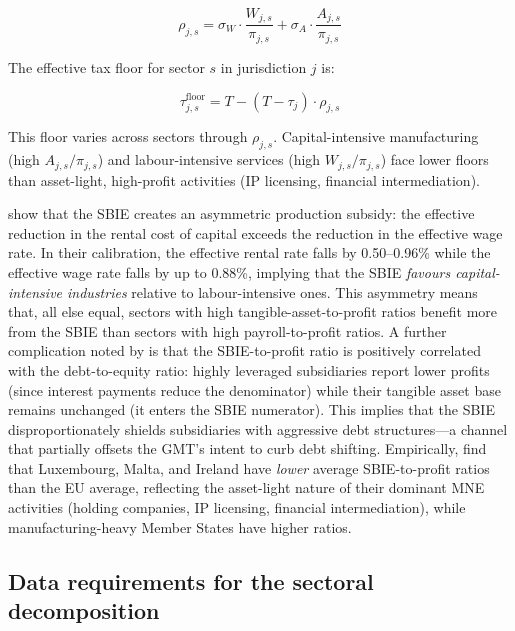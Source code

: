 \documentclass[11pt,a4paper]{article}
\begin{document}
\begin{equation}\label{eq:rho_sector}
\rho_{j,s} = \sigma_W \cdot \frac{W_{j,s}}{\pi_{j,s}} + \sigma_A \cdot \frac{A_{j,s}}{\pi_{j,s}}
\end{equation}

The effective tax floor for sector $s$ in jurisdiction $j$ is:

\begin{equation}\label{eq:floor_sector}
\tau_{j,s}^{\text{floor}} = T - (T - \tau_j) \cdot \rho_{j,s}
\end{equation}

This floor varies across sectors through $\rho_{j,s}$. Capital-intensive manufacturing (high $A_{j,s}/\pi_{j,s}$) and labour-intensive services (high $W_{j,s}/\pi_{j,s}$) face lower floors than asset-light, high-profit activities (IP licensing, financial intermediation).

\citet{schjelderup2024} show that the SBIE creates an asymmetric production subsidy: the effective reduction in the rental cost of capital exceeds the reduction in the effective wage rate. In their calibration, the effective rental rate falls by 0.50--0.96\% while the effective wage rate falls by up to 0.88\%, implying that the SBIE \emph{favours capital-intensive industries} relative to labour-intensive ones. This asymmetry means that, all else equal, sectors with high tangible-asset-to-profit ratios benefit more from the SBIE than sectors with high payroll-to-profit ratios. A further complication noted by \citet{devereux2023} is that the SBIE-to-profit ratio is positively correlated with the debt-to-equity ratio: highly leveraged subsidiaries report lower profits (since interest payments reduce the denominator) while their tangible asset base remains unchanged (it enters the SBIE numerator). This implies that the SBIE disproportionately shields subsidiaries with aggressive debt structures---a channel that partially offsets the GMT's intent to curb debt shifting. Empirically, \citet{devereux2023} find that Luxembourg, Malta, and Ireland have \emph{lower} average SBIE-to-profit ratios than the EU average, reflecting the asset-light nature of their dominant MNE activities (holding companies, IP licensing, financial intermediation), while manufacturing-heavy Member States have higher ratios.

\subsection{Data requirements for the sectoral decomposition}\label{sec:sbie_data}
\end{document}
